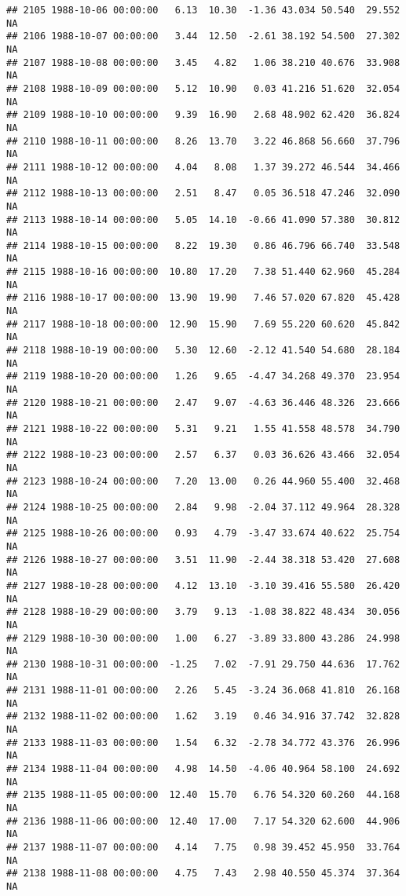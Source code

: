 \documentclass{article}\usepackage{graphicx, color}
\makeatletter
\newenvironment{kframe}{%
 \def\at@end@of@kframe{}%
 \ifinner\ifhmode%
  \def\at@end@of@kframe{\end{minipage}}%
  \begin{minipage}{\columnwidth}%
 \fi\fi%
 \def\FrameCommand##1{\hskip\@totalleftmargin \hskip-\fboxsep
 \colorbox{shadecolor}{##1}\hskip-\fboxsep
     \hskip-\linewidth \hskip-\@totalleftmargin \hskip\columnwidth}%
 \MakeFramed {\advance\hsize-\width
   \@totalleftmargin\z@ \linewidth\hsize
   \@setminipage}}%
 {\par\unskip\endMakeFramed%
 \at@end@of@kframe}
\newenvironment{knitrout}{}{} %
\makeatother
\begin{document}
\begin{knitrout}
\begin{kframe}
\begin{verbatim}
## 2105 1988-10-06 00:00:00   6.13  10.30  -1.36 43.034 50.540  29.552     NA
## 2106 1988-10-07 00:00:00   3.44  12.50  -2.61 38.192 54.500  27.302     NA
## 2107 1988-10-08 00:00:00   3.45   4.82   1.06 38.210 40.676  33.908     NA
## 2108 1988-10-09 00:00:00   5.12  10.90   0.03 41.216 51.620  32.054     NA
## 2109 1988-10-10 00:00:00   9.39  16.90   2.68 48.902 62.420  36.824     NA
## 2110 1988-10-11 00:00:00   8.26  13.70   3.22 46.868 56.660  37.796     NA
## 2111 1988-10-12 00:00:00   4.04   8.08   1.37 39.272 46.544  34.466     NA
## 2112 1988-10-13 00:00:00   2.51   8.47   0.05 36.518 47.246  32.090     NA
## 2113 1988-10-14 00:00:00   5.05  14.10  -0.66 41.090 57.380  30.812     NA
## 2114 1988-10-15 00:00:00   8.22  19.30   0.86 46.796 66.740  33.548     NA
## 2115 1988-10-16 00:00:00  10.80  17.20   7.38 51.440 62.960  45.284     NA
## 2116 1988-10-17 00:00:00  13.90  19.90   7.46 57.020 67.820  45.428     NA
## 2117 1988-10-18 00:00:00  12.90  15.90   7.69 55.220 60.620  45.842     NA
## 2118 1988-10-19 00:00:00   5.30  12.60  -2.12 41.540 54.680  28.184     NA
## 2119 1988-10-20 00:00:00   1.26   9.65  -4.47 34.268 49.370  23.954     NA
## 2120 1988-10-21 00:00:00   2.47   9.07  -4.63 36.446 48.326  23.666     NA
## 2121 1988-10-22 00:00:00   5.31   9.21   1.55 41.558 48.578  34.790     NA
## 2122 1988-10-23 00:00:00   2.57   6.37   0.03 36.626 43.466  32.054     NA
## 2123 1988-10-24 00:00:00   7.20  13.00   0.26 44.960 55.400  32.468     NA
## 2124 1988-10-25 00:00:00   2.84   9.98  -2.04 37.112 49.964  28.328     NA
## 2125 1988-10-26 00:00:00   0.93   4.79  -3.47 33.674 40.622  25.754     NA
## 2126 1988-10-27 00:00:00   3.51  11.90  -2.44 38.318 53.420  27.608     NA
## 2127 1988-10-28 00:00:00   4.12  13.10  -3.10 39.416 55.580  26.420     NA
## 2128 1988-10-29 00:00:00   3.79   9.13  -1.08 38.822 48.434  30.056     NA
## 2129 1988-10-30 00:00:00   1.00   6.27  -3.89 33.800 43.286  24.998     NA
## 2130 1988-10-31 00:00:00  -1.25   7.02  -7.91 29.750 44.636  17.762     NA
## 2131 1988-11-01 00:00:00   2.26   5.45  -3.24 36.068 41.810  26.168     NA
## 2132 1988-11-02 00:00:00   1.62   3.19   0.46 34.916 37.742  32.828     NA
## 2133 1988-11-03 00:00:00   1.54   6.32  -2.78 34.772 43.376  26.996     NA
## 2134 1988-11-04 00:00:00   4.98  14.50  -4.06 40.964 58.100  24.692     NA
## 2135 1988-11-05 00:00:00  12.40  15.70   6.76 54.320 60.260  44.168     NA
## 2136 1988-11-06 00:00:00  12.40  17.00   7.17 54.320 62.600  44.906     NA
## 2137 1988-11-07 00:00:00   4.14   7.75   0.98 39.452 45.950  33.764     NA
## 2138 1988-11-08 00:00:00   4.75   7.43   2.98 40.550 45.374  37.364     NA

\end{verbatim}
\end{kframe}
\end{knitrout}
\end{document}
